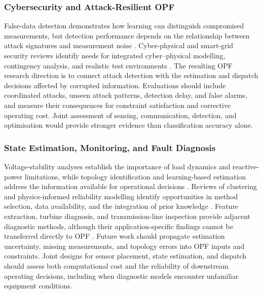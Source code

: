 \documentclass[a4paper,fleqn]{cas-sc}
\begin{document}
    \subsubsection{Cybersecurity and Attack-Resilient OPF}\label{subsubsec:gaps_cybersecurity}
    
    False-data detection demonstrates how learning can distinguish compromised measurements, but detection performance depends on the relationship between attack signatures and measurement noise \cite{opfRef037}. Cyber-physical and smart-grid security reviews identify needs for integrated cyber--physical modelling, contingency analysis, and realistic test environments \cite{opfRef067,ghiasi2023comprehensive}. The resulting OPF research direction is to connect attack detection with the estimation and dispatch decisions affected by corrupted information. Evaluations should include coordinated attacks, unseen attack patterns, detection delay, and false alarms, and measure their consequences for constraint satisfaction and corrective operating cost. Joint assessment of sensing, communication, detection, and optimisation would provide stronger evidence than classification accuracy alone.
    
    \subsubsection{State Estimation, Monitoring, and Fault Diagnosis}\label{subsubsec:gaps_state_estimation}
    
    Voltage-stability analyses establish the importance of load dynamics and reactive-power limitations, while topology identification and learning-based estimation address the information available for operational decisions \cite{opfRef002,opfRef003,bolognani2013identification,opfRef053,opfRef072}. Reviews of clustering and physics-informed reliability modelling identify opportunities in method selection, data availability, and the integration of prior knowledge \cite{miraftabzadeh2023k,xu2023physics}. Feature extraction, turbine diagnosis, and transmission-line inspection provide adjacent diagnostic methods, although their application-specific findings cannot be transferred directly to OPF \cite{opfRef027,opfRef049,opfRef080}. Future work should propagate estimation uncertainty, missing measurements, and topology errors into OPF inputs and constraints. Joint designs for sensor placement, state estimation, and dispatch should assess both computational cost and the reliability of downstream operating decisions, including when diagnostic models encounter unfamiliar equipment conditions.
    
\end{document}
